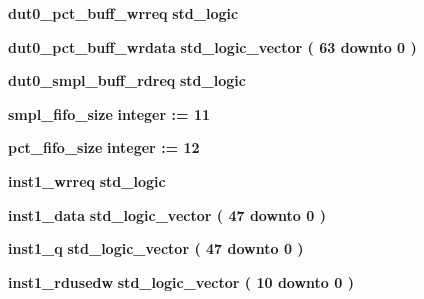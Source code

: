\begin{DoxyCompactItemize}
\item 
{\bf dut0\+\_\+pct\+\_\+buff\+\_\+wrreq} {\bfseries \textcolor{comment}{std\+\_\+logic}\textcolor{vhdlchar}{ }} 
\item 
{\bf dut0\+\_\+pct\+\_\+buff\+\_\+wrdata} {\bfseries \textcolor{comment}{std\+\_\+logic\+\_\+vector}\textcolor{vhdlchar}{ }\textcolor{vhdlchar}{(}\textcolor{vhdlchar}{ }\textcolor{vhdlchar}{ } \textcolor{vhdldigit}{63} \textcolor{vhdlchar}{ }\textcolor{keywordflow}{downto}\textcolor{vhdlchar}{ }\textcolor{vhdlchar}{ } \textcolor{vhdldigit}{0} \textcolor{vhdlchar}{ }\textcolor{vhdlchar}{)}\textcolor{vhdlchar}{ }} 
\item 
{\bf dut0\+\_\+smpl\+\_\+buff\+\_\+rdreq} {\bfseries \textcolor{comment}{std\+\_\+logic}\textcolor{vhdlchar}{ }} 
\item 
{\bf smpl\+\_\+fifo\+\_\+size} {\bfseries \textcolor{comment}{integer}\textcolor{vhdlchar}{ }\textcolor{vhdlchar}{ }\textcolor{vhdlchar}{\+:}\textcolor{vhdlchar}{=}\textcolor{vhdlchar}{ }\textcolor{vhdlchar}{ } \textcolor{vhdldigit}{11} \textcolor{vhdlchar}{ }} 
\item 
{\bf pct\+\_\+fifo\+\_\+size} {\bfseries \textcolor{comment}{integer}\textcolor{vhdlchar}{ }\textcolor{vhdlchar}{ }\textcolor{vhdlchar}{\+:}\textcolor{vhdlchar}{=}\textcolor{vhdlchar}{ }\textcolor{vhdlchar}{ } \textcolor{vhdldigit}{12} \textcolor{vhdlchar}{ }} 
\item 
{\bf inst1\+\_\+wrreq} {\bfseries \textcolor{comment}{std\+\_\+logic}\textcolor{vhdlchar}{ }} 
\item 
{\bf inst1\+\_\+data} {\bfseries \textcolor{comment}{std\+\_\+logic\+\_\+vector}\textcolor{vhdlchar}{ }\textcolor{vhdlchar}{(}\textcolor{vhdlchar}{ }\textcolor{vhdlchar}{ } \textcolor{vhdldigit}{47} \textcolor{vhdlchar}{ }\textcolor{keywordflow}{downto}\textcolor{vhdlchar}{ }\textcolor{vhdlchar}{ } \textcolor{vhdldigit}{0} \textcolor{vhdlchar}{ }\textcolor{vhdlchar}{)}\textcolor{vhdlchar}{ }} 
\item 
{\bf inst1\+\_\+q} {\bfseries \textcolor{comment}{std\+\_\+logic\+\_\+vector}\textcolor{vhdlchar}{ }\textcolor{vhdlchar}{(}\textcolor{vhdlchar}{ }\textcolor{vhdlchar}{ } \textcolor{vhdldigit}{47} \textcolor{vhdlchar}{ }\textcolor{keywordflow}{downto}\textcolor{vhdlchar}{ }\textcolor{vhdlchar}{ } \textcolor{vhdldigit}{0} \textcolor{vhdlchar}{ }\textcolor{vhdlchar}{)}\textcolor{vhdlchar}{ }} 
\item 
{\bf inst1\+\_\+rdusedw} {\bfseries \textcolor{comment}{std\+\_\+logic\+\_\+vector}\textcolor{vhdlchar}{ }\textcolor{vhdlchar}{(}\textcolor{vhdlchar}{ }\textcolor{vhdlchar}{ } \textcolor{vhdldigit}{10} \textcolor{vhdlchar}{ }\textcolor{keywordflow}{downto}\textcolor{vhdlchar}{ }\textcolor{vhdlchar}{ } \textcolor{vhdldigit}{0} \textcolor{vhdlchar}{ }\textcolor{vhdlchar}{)}\textcolor{vhdlchar}{ }} 

\end{DoxyCompactItemize}
